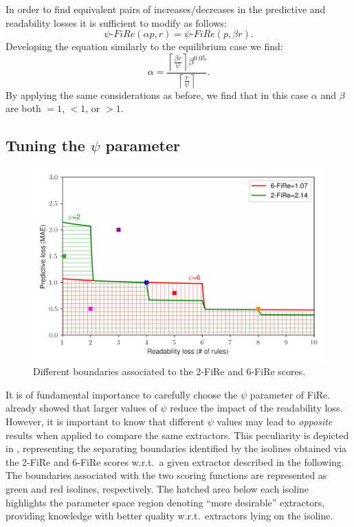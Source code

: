 \documentclass{article}
\newcommand{\fire}{FiRe}
\begin{document}
In order to find equivalent pairs of increases/decreases in the predictive and readability losses it is sufficient to modify  as follows:
%
\begin{equation}\label{eq:equi3}
	\psi\textrm{-}\fire(\alpha p, r) = \psi\textrm{-}\fire(p, \beta r).
\end{equation}
%
Developing the equation similarly to the equilibrium case we find:
%
\begin{equation}\label{eq:alpha}
	\alpha = \frac{\left \lceil{\frac{\beta r}{\psi}}\right \rceil \beta^{0.05}}{\left \lceil{\frac{r}{\psi}}\right \rceil}.
\end{equation}
%
By applying the same considerations as before, we find that in this case $\alpha$ and $\beta$ are both $=1$, $<1$, or $>1$.

\subsection{Tuning the $\psi$ parameter}\label{ssec:psi}

\begin{figure}
	\centering
	\includegraphics[width=\linewidth]{figures/areas.pdf}
	\caption{Different boundaries associated to the 2-\fire{} and 6-\fire{} scores.}\label{fig:areas}
\end{figure}

It is of fundamental importance to carefully choose the $\psi$ parameter of \fire{}.
%
 already showed that larger values of $\psi$ reduce the impact of the readability loss.
%
However, it is important to know that different $\psi$ values may lead to \emph{opposite} results when applied to compare the same extractors.
%
This peculiarity is depicted in , representing the separating boundaries identified by the isolines obtained via the 2-\fire{} and 6-\fire{} scores w.r.t.\ a given extractor described in the following.
%
The boundaries associated with the two scoring functions are represented as green and red isolines, respectively.
%
The hatched area below each isoline highlights the parameter space region denoting ``more desirable'' extractors, providing knowledge with better quality w.r.t.\ extractors lying on the isoline.
\end{document}

